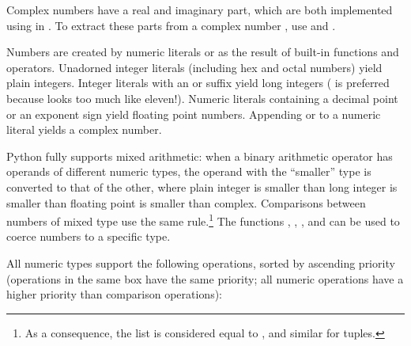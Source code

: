 Complex numbers have a real and imaginary part, which are both
implemented using  in \C{}.  To extract these parts from
a complex number , use  and .  

Numbers are created by numeric literals or as the result of built-in
functions and operators.  Unadorned integer literals (including hex
and octal numbers) yield plain integers.  Integer literals with an 
or  suffix yield long integers
( is preferred because  looks too much like eleven!).
Numeric literals containing a decimal point or an exponent sign yield
floating point numbers.  Appending  or  to a numeric
literal yields a complex number.

Python fully supports mixed arithmetic: when a binary arithmetic
operator has operands of different numeric types, the operand with the
``smaller'' type is converted to that of the other, where plain
integer is smaller than long integer is smaller than floating point is
smaller than complex.
Comparisons between numbers of mixed type use the same rule.\footnote{
	As a consequence, the list \code{[1, 2]} is considered equal
        to \code{[1.0, 2.0]}, and similar for tuples.}
The functions , , ,
and  can be used
to coerce numbers to a specific type.

All numeric types support the following operations, sorted by
ascending priority (operations in the same box have the same
priority; all numeric operations have a higher priority than
comparison operations):

